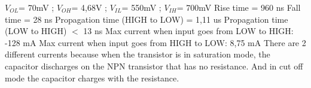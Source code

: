$V_{OL}$= 70mV ; 
$V_{OH}$= 4,68V ; 
$V_{IL}$= 550mV ;
$V_{IH}$= 700mV
\newline
Rise time = 960 ns
\newline
Fall time = 28 ns
\newline
Propagation time (HIGH to LOW) = 1,11 us
\newline
Propagation time (LOW to HIGH) $<$ 13 ns
\newline
Max current when input goes from LOW to HIGH: -128 mA
\newline
Max current when input goes from HIGH to LOW: 8,75 mA
\newline
There are 2 different currents because when the transistor
 is in saturation mode, the capacitor discharges on the 
 NPN transistor that has no resistance. And in cut off
  mode the capacitor charges with the resistance.

